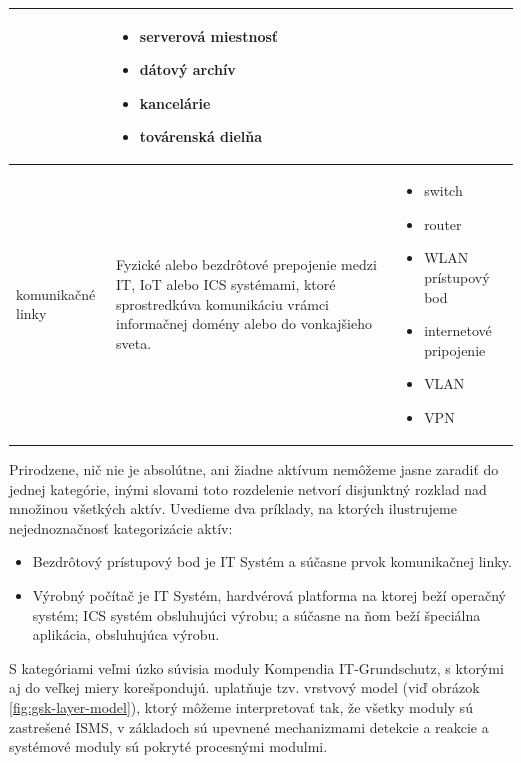 \begin{table}[h!]
\begin{center}
\begin{tabular}{ |p{}|p{}|p{}| }
                      &
                      \begin{itemize}[nosep]
                        \item serverová miestnosť
                        \item dátový archív
                        \item kancelárie
                        \item továrenská dielňa
                      \end{itemize}
            \\
            \hline
            komunikačné linky
                      &
            Fyzické alebo bezdrôtové prepojenie medzi IT, IoT alebo ICS systémami, ktoré sprostredkúva komunikáciu vrámci informačnej domény alebo do vonkajšieho sveta.
                      &
                      \begin{itemize}[nosep]
                        \item switch
                        \item router
                        \item WLAN prístupový bod
                        \item internetové pripojenie
                        \item VLAN
                        \item VPN
                      \end{itemize}
            \\
            \hline
        \end{tabular}
    \end{center}
    \end{table}

Prirodzene, nič nie je absolútne, ani žiadne aktívum nemôžeme jasne zaradiť do jednej kategórie, inými slovami toto rozdelenie netvorí disjunktný
rozklad nad množinou všetkých aktív. Uvedieme dva príklady, na ktorých ilustrujeme nejednoznačnosť kategorizácie aktív:
\begin{itemize}[nosep]
    \item Bezdrôtový prístupový bod je IT Systém a súčasne prvok komunikačnej linky.
    \item Výrobný počítač je IT Systém, hardvérová platforma na ktorej beží operačný systém; ICS systém obsluhujúci výrobu; a súčasne na ňom beží
    špeciálna aplikácia, obsluhujúca výrobu.
\end{itemize}

S kategóriami veľmi úzko súvisia moduly Kompendia IT-Grundschutz, s ktorými aj do veľkej miery korešpondujú. \cite{GSK} uplatňuje tzv. vrstvový model
(viď obrázok \ref{fig:gsk-layer-model}), ktorý môžeme interpretovať tak, že všetky moduly sú zastrešené ISMS, v základoch sú upevnené mechanizmami
detekcie a reakcie a systémové moduly sú pokryté procesnými modulmi.  

